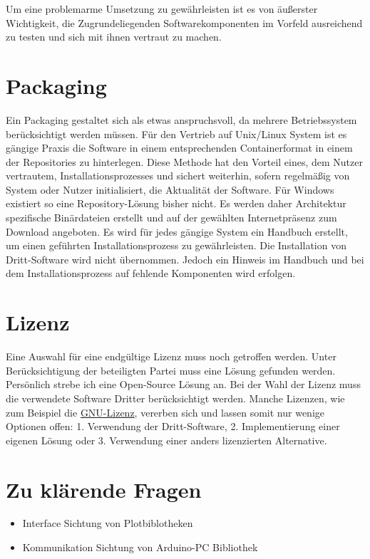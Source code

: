 Um eine problemarme Umsetzung zu gewährleisten ist es von äußerster Wichtigkeit, die Zugrundeliegenden Softwarekomponenten im Vorfeld ausreichend zu testen und sich mit ihnen vertraut zu machen. 
\section{Packaging}
Ein Packaging gestaltet sich als etwas anspruchsvoll, da mehrere Betriebssystem berücksichtigt werden müssen. Für den Vertrieb auf Unix/Linux System ist es gängige Praxis die Software in einem entsprechenden Containerformat in einem der Repositories zu hinterlegen. Diese Methode hat den Vorteil eines, dem Nutzer vertrautem, Installationsprozesses und sichert weiterhin, sofern regelmäßig von System oder Nutzer initialisiert, die Aktualität der Software. 
Für Windows existiert so eine Repository-Lösung bisher nicht. Es werden daher Architektur spezifische Binärdateien erstellt und auf der gewählten Internetpräsenz zum Download angeboten. 
Es wird für jedes gängige System ein Handbuch erstellt, um einen geführten Installationsprozess zu gewährleisten.
Die Installation von Dritt-Software wird nicht übernommen. Jedoch ein Hinweis im Handbuch und bei dem Installationsprozess auf fehlende Komponenten wird erfolgen.
\section{Lizenz}
Eine Auswahl für eine endgültige Lizenz muss noch getroffen werden. Unter Berücksichtigung der beteiligten Partei muss eine Lösung gefunden werden. Persönlich strebe ich eine Open-Source Lösung an.
Bei der Wahl der Lizenz muss die verwendete Software Dritter berücksichtigt werden. Manche Lizenzen, wie zum Beispiel die \href{https://www.gnu.org/licenses/licenses.html#GPL}{GNU-Lizenz}, vererben sich und lassen somit nur wenige Optionen offen: 1. Verwendung der Dritt-Software, 2. Implementierung einer eigenen Lösung oder 3. Verwendung einer anders lizenzierten Alternative.
\section{Zu klärende Fragen}
\begin{itemize}
 \item Interface
  \subitem Sichtung von Plotbiblotheken
 \item Kommunikation
  \subitem Sichtung von Arduino-PC Bibliothek
  
\end{itemize}


